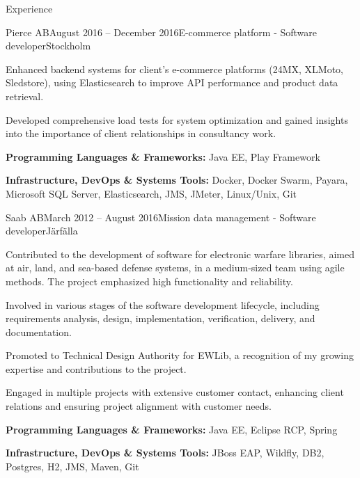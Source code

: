 \documentclass{resume}
\begin{document}
\begin{rSection}{Experience}
    \begin{rSubsection}{Pierce AB}{August 2016 -- December 2016}{E-commerce platform - Software developer}{Stockholm}
      \item Enhanced backend systems for client's e-commerce platforms (24MX, XLMoto, Sledstore), using Elasticsearch to improve API performance and product data retrieval.
      \item Developed comprehensive load tests for system optimization and gained insights into the importance of client relationships in consultancy work.
      \item \textbf{Programming Languages \& Frameworks:} Java EE, Play Framework
      \item \textbf{Infrastructure, DevOps \& Systems Tools:} Docker, Docker Swarm, Payara, Microsoft SQL Server, Elasticsearch, JMS, JMeter, Linux/Unix, Git
    \end{rSubsection}

    \begin{rSubsection}{Saab AB}{March 2012 -- August 2016}{Mission data management - Software developer}{Järfälla}
      \item Contributed to the development of software for electronic warfare libraries, aimed at air, land, and sea-based defense systems, in a medium-sized team using agile methods. The project emphasized high functionality and reliability.
      \item Involved in various stages of the software development lifecycle, including requirements analysis, design, implementation, verification, delivery, and documentation.
      \item Promoted to Technical Design Authority for EWLib, a recognition of my growing expertise and contributions to the project.
      \item Engaged in multiple projects with extensive customer contact, enhancing client relations and ensuring project alignment with customer needs.
      \item \textbf{Programming Languages \& Frameworks:} Java EE, Eclipse RCP, Spring
      \item \textbf{Infrastructure, DevOps \& Systems Tools:} JBoss EAP, Wildfly, DB2, Postgres, H2, JMS, Maven, Git
    \end{rSubsection}


\end{rSection}
\end{document}
